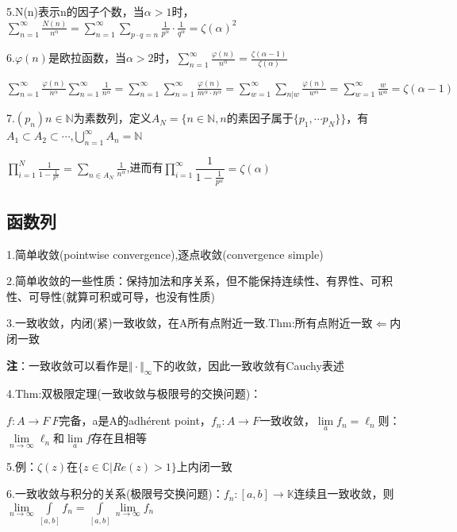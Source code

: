 \documentclass[hyperfer,UTF8,a4paper,12pt]{article}
\theoremstyle{plain}
\begin{document}
5.N(n)表示n的因子个数，当$ \alpha >1$时，$ \sum\limits_{n=1}^{\infty}\frac{N(n)}{n^\alpha}=
 \sum\limits_{n=1}^{\infty}\sum\limits_{p\cdot q=n}\frac{1}{p^\alpha}\cdot\frac{1}{q^\alpha}
 =\zeta(\alpha)^2$

6.$ \varphi(n) $是欧拉函数，当$ \alpha >2$时，$ \sum\limits_{n=1}^{\infty}\frac{\varphi(n)}{n^\alpha}=\frac{\zeta(\alpha-1)}{\zeta(\alpha)} $

$ \sum\limits_{n=1}^{\infty}\frac{\varphi(n)}{n^\alpha}
\sum\limits_{n=1}^{\infty}\frac{1}{n^\alpha}= 
\sum\limits_{n=1}^{\infty}\sum\limits_{n=1}^{\infty}\frac{\varphi(n)}{m^\alpha\cdot n^\alpha}
=\sum\limits_{w=1}^{\infty}\sum\limits_{n|w}\frac{\varphi(n)}{w^\alpha}=
\sum\limits_{w=1}^{\infty}\frac{w}{w^\alpha}=\zeta(\alpha-1)$

7.$ (p_n){n\in\mathbb{N}} $为素数列，定义$ A_N=\{n\in\mathbb{N},n\textrm{的素因子属于}\{p_1,\cdots p_N\} \} $，有$ A_1\subset A_2\subset\cdots $,$ \bigcup\limits_{n=1}^{\infty}A_n=\mathbb{N} $

$\prod\limits_{i=1}^{N}\frac{1}{1-\frac{1}{p^\alpha}}=
\sum\limits_{n\in A_N}\frac{1}{n^\alpha}$,进而有$ \prod\limits_{i=1}^{\infty}\dfrac{1}{1-\frac{1}{p^\alpha}}=\zeta(\alpha) $

\subsection{函数列}\hspace*{-2em}
1.简单收敛(pointwise convergence),逐点收敛(convergence simple)

2.简单收敛的一些性质：保持加法和序关系，但不能保持连续性、有界性、可积性、可导性(就算可积或可导，也没有性质)

3.一致收敛，内闭(紧)一致收敛，在A所有点附近一致.Thm:所有点附近一致$ \Leftarrow $内闭一致

\textbf{注}：一致收敛可以看作是$ \Vert\cdot\Vert_\infty $下的收敛，因此一致收敛有Cauchy表述

4.Thm:双极限定理(一致收敛与极限号的交换问题)：

$ f:A\to F \ F$完备，a是A的adhérent point，$ f_n:A\to F $一致收敛，$ \lim\limits_{a}f_n=\ell_n $则：$ \lim\limits_{n\to\infty}\ell_n$和$\lim\limits_{a}f $存在且相等

5.例：$\zeta(z)$在$ \{z\in \mathbb{C}| Re(z)>1 \} $上内闭一致

6.一致收敛与积分的关系(极限号交换问题)：$ f_n:[a,b]\to\mathbb{K} $连续且一致收敛，则$ \lim\limits_{n\to\infty}\int\limits_{[a,b]}f_n=\int\limits_{[a,b]}\lim\limits_{n\to\infty}f_n $
\end{document}
